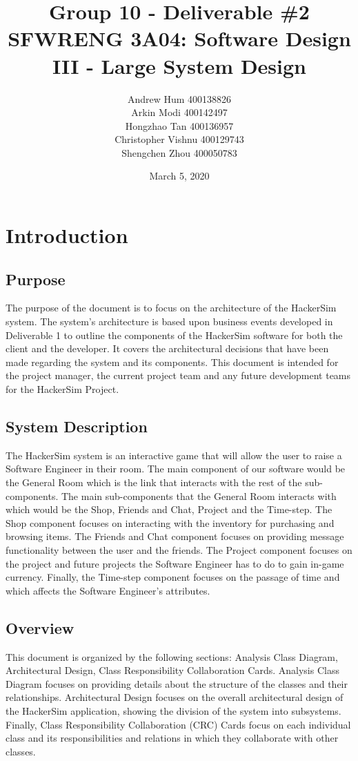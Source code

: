 \documentclass[]{article}
\title{
    \textbf{Group 10 - Deliverable \#2}\\
    \large SFWRENG 3A04: Software Design III - Large System Design
}
\author{
    Andrew Hum 400138826\\
    Arkin Modi 400142497\\
    Hongzhao Tan 400136957\\
    Christopher Vishnu 400129743\\
    Shengchen Zhou 400050783\\
}
\date{March 5, 2020}
\begin{document}
\maketitle
\newpage

\section{Introduction}
\label{sec:introduction}

\subsection{Purpose}
\label{sub:purpose}
The purpose of the document is to focus on the architecture of the HackerSim 
system. The system's architecture is based upon business events developed in 
Deliverable 1 to outline the components of the HackerSim software for both the 
client and the developer. It covers the architectural decisions that have been 
made regarding the system and its components. This document is intended for the 
project manager, the current project team and any future development teams for 
the HackerSim Project.

\subsection{System Description}
\label{sub:system_description}
The HackerSim system is an interactive game that will allow the user to raise a 
Software Engineer in their room. The main component of our software would be 
the General Room which is the link that interacts with the rest of the 
sub-components. The main sub-components that the General Room interacts with 
which would be the Shop, Friends and Chat, Project and the Time-step. The Shop 
component focuses on interacting with the inventory for purchasing and browsing 
items. The Friends and Chat component focuses on providing message functionality 
between the user and the friends. The Project component focuses on the project 
and future projects the Software Engineer has to do to gain in-game currency. 
Finally, the Time-step component focuses on the passage of time and which 
affects the Software Engineer’s attributes.

\subsection{Overview}
\label{sub:overview}
This document is organized by the following sections: Analysis Class Diagram, 
Architectural Design, Class Responsibility Collaboration Cards. Analysis Class 
Diagram focuses on providing details about the structure of the classes and 
their relationships. Architectural Design focuses on the overall architectural 
design of the HackerSim application, showing the division of the system into 
subsystems. Finally, Class Responsibility Collaboration (CRC) Cards focus on 
each individual class and its responsibilities and relations in which they 
collaborate with other classes.
\end{document}
